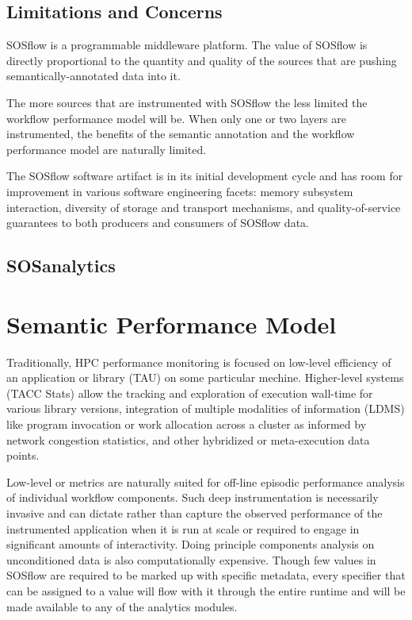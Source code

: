 \subsection{Limitations and Concerns}
SOSflow is a programmable middleware platform.  The value of SOSflow is
directly proportional to the quantity and quality of the sources that
are pushing semantically-annotated data into it.

The more sources that are instrumented with SOSflow the less limited
the workflow performance model will be. When only one or two layers
are instrumented, the benefits of the semantic annotation and the
workflow performance model are naturally limited.

The SOSflow software artifact is in its initial development cycle and
has room for improvement in various software engineering facets:
memory subsystem interaction, diversity of storage and transport
mechanisms, and quality-of-service guarantees to both producers and
consumers of SOSflow data.


\subsection{SOSanalytics}






\section{Semantic Performance Model}
Traditionally, HPC performance monitoring is focused on low-level
efficiency of an application or library (TAU) on some particular mechine.
Higher-level systems (TACC Stats) allow the tracking and exploration
of execution wall-time for various library versions, integration of
multiple modalities of information (LDMS) like program invocation or
work allocation across a cluster as informed by network congestion
statistics, and other hybridized or meta-execution data points.

Low-level or metrics are naturally suited for off-line episodic
performance analysis of individual workflow components. Such deep
instrumentation is necessarily invasive and can dictate rather than
capture the observed performance of the instrumented application when
it is run at scale or required to engage in significant amounts of
interactivity. Doing principle components analysis on unconditioned
data is also computationally expensive.  Though few values in SOSflow
are required to be marked up with specific metadata, every specifier
that can be assigned to a value will flow with it through the entire
runtime and will be made available to any of the analytics modules.

